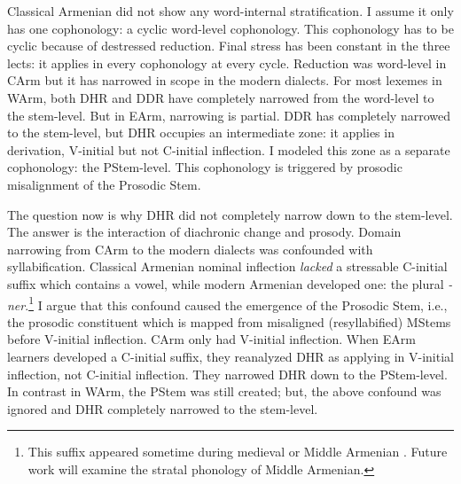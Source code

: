 Classical Armenian did not show any word-internal stratification. I assume it only has one cophonology: a cyclic word-level cophonology. This cophonology has to be cyclic because of destressed reduction. Final stress has been constant in the three lects: it applies in every cophonology at every cycle. Reduction was word-level in CArm but it has narrowed in scope in the modern dialects. For most lexemes in WArm, both DHR and DDR have completely narrowed from the word-level to the stem-level. But in EArm, narrowing is partial. DDR has completely narrowed to the stem-level, but  DHR occupies an intermediate  zone:  it applies in derivation,   V-initial but not C-initial inflection. I modeled this zone as a separate cophonology: the PStem-level. This  cophonology is triggered by  prosodic misalignment of the   Prosodic Stem. 

The question now is why DHR did not completely narrow down to the stem-level. The answer is the interaction of diachronic change and prosody. Domain narrowing from CArm to the modern dialects  was confounded with syllabification.  Classical Armenian nominal inflection \textit{lacked} a stressable C-initial suffix which contains a vowel, while modern Armenian developed one: the plural \textit{-ner}.\footnote{This suffix appeared sometime during medieval or Middle Armenian \citep{Karst-1901-MiddleArmenain}. Future work will examine the stratal phonology of Middle Armenian.}  I argue that this confound caused the emergence of the Prosodic Stem, i.e., the prosodic constituent which is mapped from misaligned (resyllabified) MStems before V-initial inflection.   CArm only had V-initial inflection. When EArm learners developed a C-initial suffix, they reanalyzed DHR as applying in V-initial inflection, not C-initial inflection. They narrowed DHR down to the PStem-level. In contrast in WArm, the PStem was still created; but, the above confound was ignored and DHR completely narrowed to the stem-level. %



